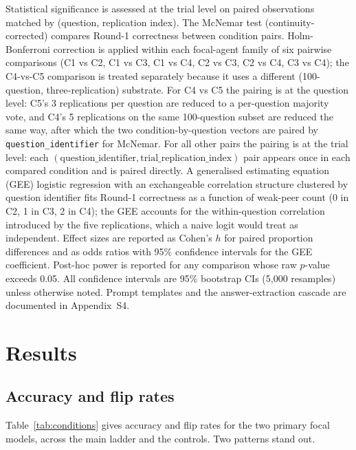 \documentclass[11pt]{article}
\begin{document}
Statistical significance is assessed at the trial level on paired
observations matched by (question, replication index).
The McNemar test (continuity-corrected) compares Round-1 correctness
between condition pairs.
Holm-Bonferroni correction is applied within each focal-agent family of
six pairwise comparisons (C1 vs C2, C1 vs C3, C1 vs C4, C2 vs C3,
C2 vs C4, C3 vs C4); the C4-vs-C5 comparison is treated separately
because it uses a different (100-question, three-replication) substrate.
For C4 vs C5 the pairing is at the question level: C5's 3 replications
per question are reduced to a per-question majority vote, and C4's
5 replications on the same 100-question subset are reduced the same
way, after which the two condition-by-question vectors are paired by
\texttt{question\_identifier} for McNemar.
For all other pairs the pairing is at the trial level: each
$(\text{question\_identifier}, \text{trial\_replication\_index})$
pair appears once in each compared condition and is paired directly.
A generalised estimating equation (GEE) logistic regression with an
exchangeable correlation structure clustered by question identifier
fits Round-1 correctness as a function of weak-peer count (0 in C2,
1 in C3, 2 in C4); the GEE accounts for the within-question correlation
introduced by the five replications, which a naive logit would treat as
independent.
Effect sizes are reported as Cohen's $h$ for paired proportion
differences and as odds ratios with 95\% confidence intervals for the
GEE coefficient.
Post-hoc power is reported for any comparison whose raw $p$-value
exceeds 0.05.
All confidence intervals are 95\% bootstrap CIs (5{,}000 resamples)
unless otherwise noted.
Prompt templates and the answer-extraction cascade are documented in
Appendix~S4.

\section{Results}
\label{sec:results}

\subsection{Accuracy and flip rates}
\label{sub:accuracy}

Table~\ref{tab:conditions} gives accuracy and flip rates for the two
primary focal models, across the main ladder and the controls.
Two patterns stand out.
\end{document}
